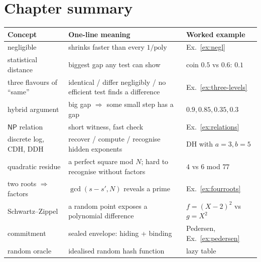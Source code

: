 \documentclass[11pt,a4paper]{report}
\theoremstyle{plain}
\theoremstyle{definition}
\theoremstyle{remark}
\newcommand{\NP}{\mathsf{NP}}\newcommand{\BPP}{\mathsf{BPP}}\newcommand{\IP}{\mathsf{IP}}
\begin{document}
\section{Chapter summary}
\begin{center}
\small\renewcommand{\arraystretch}{1.25}
\begin{tabular}{@{}L{3.6cm} L{6.4cm} L{3.7cm}@{}}
\toprule
\textbf{Concept} & \textbf{One-line meaning} & \textbf{Worked example}\\
\midrule
negligible & shrinks faster than every $1/\mathrm{poly}$ & Ex.~\ref{ex:negl}\\
statistical distance & biggest gap any test can show & coin $0.5$ vs $0.6$: $0.1$\\
three flavours of ``same'' & identical / differ negligibly / no efficient test finds a difference & Ex.~\ref{ex:three-levels}\\
hybrid argument & big gap $\Rightarrow$ some small step has a gap & $0.9,0.85,0.35,0.3$\\
$\NP$ relation & short witness, fast check & Ex.~\ref{ex:relations}\\
discrete log, CDH, DDH & recover / compute / recognise hidden exponents & DH with $a=3,b=5$\\
quadratic residue & a perfect square mod $N$; hard to recognise without factors & $4$ vs $6$ mod $77$\\
two roots $\Rightarrow$ factors & $\gcd(s-s',N)$ reveals a prime & Ex.~\ref{ex:fourroots}\\
Schwartz--Zippel & a random point exposes a polynomial difference & $f=(X-2)^2$ vs $g=X^2$\\
commitment & sealed envelope: hiding + binding & Pedersen, Ex.~\ref{ex:pedersen}\\
random oracle & idealised random hash function & lazy table\\
\bottomrule
\end{tabular}
\end{center}
\end{document}
